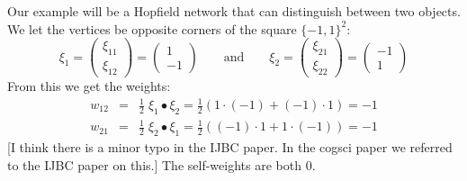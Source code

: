   Our example will be a Hopfield network that can distinguish between two 
objects.  We let the vertices be opposite corners of the square
$\{-1,1\}^2$:
\begin{equation*}
\xi_1 = 
\begin{pmatrix}
\xi_{11} \\ \xi_{12}
\end{pmatrix}
=
\begin{pmatrix}
1 \\ -1
\end{pmatrix}
\qquad \mathrm{and} \qquad
\xi_2 = 
\begin{pmatrix}
\xi_{21} \\ \xi_{22}
\end{pmatrix}
=
\begin{pmatrix}
-1 \\ 1
\end{pmatrix}
\end{equation*}
From this we get the weights:
\begin{eqnarray*}
      w_{12} &=& \frac{1}{2} \; \xi_1 \bullet \xi_2
              =  \frac{1}{2} (1 \cdot (-1) + (-1) \cdot 1) = -1 \\
      w_{21} &=& \frac{1}{2} \; \xi_2 \bullet \xi_1
              =  \frac{1}{2} ((-1) \cdot 1 + 1 \cdot (-1)) = -1
\end{eqnarray*}
[I think there is a minor typo in the IJBC paper.  In the cogsci paper we 
referred to the IJBC paper on this.]  The self-weights are both $0$.

